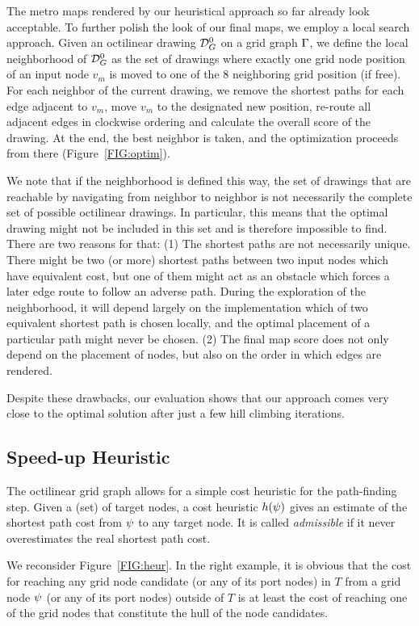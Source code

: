 \documentclass[sigconf]{acmart}
\begin{document}
The metro maps rendered by our heuristical approach so far already look acceptable.
To further polish the look of our final maps, we employ a local search approach.
Given an octilinear drawing $\mathcal{D}_{G}^0$ on a grid graph $\Gamma$, we define the local neighborhood of $\mathcal{D}_{G}^0$ as the set of drawings where exactly one grid node position of an input node $v_m$ is moved to one of the 8 neighboring grid position (if free).
For each neighbor of the current drawing, we remove the shortest paths for each edge adjacent to $v_m$, move $v_m$ to the designated new position, re-route all adjacent edges in clockwise ordering and calculate the overall score of the drawing.
At the end, the best neighbor is taken, and the optimization proceeds from there (Figure~\ref{FIG:optim}).

We note that if the neighborhood is defined this way, the set of drawings that are reachable by navigating from neighbor to neighbor is not necessarily the complete set of possible octilinear drawings.
In particular, this means that the optimal drawing might not be included in this set and is therefore impossible to find.
There are two reasons for that: 
(1) The shortest paths are not necessarily unique.
There might be two (or more) shortest paths between two input nodes which have equivalent cost, but one of them might act as an obstacle which forces a later edge route to follow an adverse path.
During the exploration of the neighborhood, it will depend largely on the implementation which of two equivalent shortest path is chosen locally, and the optimal placement of a particular path might never be chosen.
(2) The final map score does not only depend on the placement of nodes, but also on the order in which edges are rendered.

Despite these drawbacks, our evaluation shows that our approach comes very close to the optimal solution after just a few hill climbing iterations.

\subsection{Speed-up Heuristic}

The octilinear grid graph allows for a simple cost heuristic for the path-finding step.
Given a (set) of target nodes, a cost heuristic $h(\psi)$ gives an estimate of the shortest path cost from $\psi$ to any target node.
It is called \emph{admissible} if it never overestimates the real shortest path cost.

We reconsider Figure~\ref{FIG:heur}.
In the right example, it is obvious that the cost for reaching any grid node candidate (or any of its port nodes) in $T$ from a grid node $\psi$ (or any of its port nodes) outside of $T$ is at least the cost of reaching one of the grid nodes that constitute the hull of the node candidates.
\end{document}
